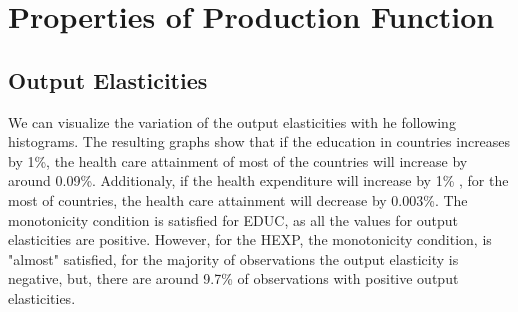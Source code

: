 \documentclass[12pt,a4paper]{article}\usepackage[]{graphicx}\usepackage[]{color}
\begin{document}
\section{Properties of Production Function}

\subsection{Output Elasticities}

We can visualize the variation of the output elasticities with he following histograms. The resulting graphs show that if the education in countries increases 
 by 1\%, the health care attainment of most of the countries 
will increase by around 0.09\%. Additionaly, if the health expenditure will increase by 1\% , for the most of  
countries, the health care attainment will decrease by 0.003\%.
The monotonicity condition is satisfied for EDUC, as all the values for output elasticities
are positive.
However, for the HEXP, the monotonicity condition, is "almost" satisfied, 
for the majority of observations the output elasticity is negative, but, there are
around 9.7\% of observations with positive output elasticities. 
\end{document}
